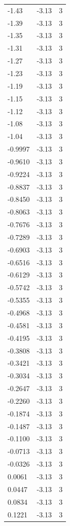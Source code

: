 \begin{longtable}{lrr}
  -1.43 & -3.13 & 3 \\
  -1.39 & -3.13 & 3 \\
  -1.35 & -3.13 & 3 \\
  -1.31 & -3.13 & 3 \\
  -1.27 & -3.13 & 3 \\
  -1.23 & -3.13 & 3 \\
  -1.19 & -3.13 & 3 \\
  -1.15 & -3.13 & 3 \\
  -1.12 & -3.13 & 3 \\
  -1.08 & -3.13 & 3 \\
  -1.04 & -3.13 & 3 \\
  -0.9997 & -3.13 & 3 \\
  -0.9610 & -3.13 & 3 \\
  -0.9224 & -3.13 & 3 \\
  -0.8837 & -3.13 & 3 \\
  -0.8450 & -3.13 & 3 \\
  -0.8063 & -3.13 & 3 \\
  -0.7676 & -3.13 & 3 \\
  -0.7289 & -3.13 & 3 \\
  -0.6903 & -3.13 & 3 \\
  -0.6516 & -3.13 & 3 \\
  -0.6129 & -3.13 & 3 \\
  -0.5742 & -3.13 & 3 \\
  -0.5355 & -3.13 & 3 \\
  -0.4968 & -3.13 & 3 \\
  -0.4581 & -3.13 & 3 \\
  -0.4195 & -3.13 & 3 \\
  -0.3808 & -3.13 & 3 \\
  -0.3421 & -3.13 & 3 \\
  -0.3034 & -3.13 & 3 \\
  -0.2647 & -3.13 & 3 \\
  -0.2260 & -3.13 & 3 \\
  -0.1874 & -3.13 & 3 \\
  -0.1487 & -3.13 & 3 \\
  -0.1100 & -3.13 & 3 \\
  -0.0713 & -3.13 & 3 \\
  -0.0326 & -3.13 & 3 \\
  0.0061 & -3.13 & 3 \\
  0.0447 & -3.13 & 3 \\
  0.0834 & -3.13 & 3 \\
  0.1221 & -3.13 & 3 \\

\end{longtable}
